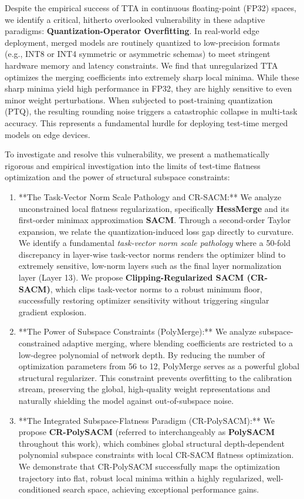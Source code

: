 Despite the empirical success of TTA in continuous floating-point (FP32) spaces, we identify a critical, hitherto overlooked vulnerability in these adaptive paradigms: \textbf{Quantization-Operator Overfitting}. In real-world edge deployment, merged models are routinely quantized to low-precision formats (e.g., INT8 or INT4 symmetric or asymmetric schemas) to meet stringent hardware memory and latency constraints. We find that unregularized TTA optimizes the merging coefficients into extremely sharp local minima. While these sharp minima yield high performance in FP32, they are highly sensitive to even minor weight perturbations. When subjected to post-training quantization (PTQ), the resulting rounding noise triggers a catastrophic collapse in multi-task accuracy. This represents a fundamental hurdle for deploying test-time merged models on edge devices.

To investigate and resolve this vulnerability, we present a mathematically rigorous and empirical investigation into the limits of test-time flatness optimization and the power of structural subspace constraints:
\begin{enumerate}
    \item **The Task-Vector Norm Scale Pathology and CR-SACM:** We analyze unconstrained local flatness regularization, specifically \textbf{HessMerge} and its first-order minimax approximation \textbf{SACM}. Through a second-order Taylor expansion, we relate the quantization-induced loss gap directly to curvature. We identify a fundamental \emph{task-vector norm scale pathology} where a 50-fold discrepancy in layer-wise task-vector norms renders the optimizer blind to extremely sensitive, low-norm layers such as the final layer normalization layer (Layer 13). We propose \textbf{Clipping-Regularized SACM (CR-SACM)}, which clips task-vector norms to a robust minimum floor, successfully restoring optimizer sensitivity without triggering singular gradient explosion.
    \item **The Power of Subspace Constraints (PolyMerge):** We analyze subspace-constrained adaptive merging, where blending coefficients are restricted to a low-degree polynomial of network depth. By reducing the number of optimization parameters from 56 to 12, PolyMerge serves as a powerful global structural regularizer. This constraint prevents overfitting to the calibration stream, preserving the global, high-quality weight representations and naturally shielding the model against out-of-subspace noise.
    \item **The Integrated Subspace-Flatness Paradigm (CR-PolySACM):** We propose \textbf{CR-PolySACM} (referred to interchangeably as \textbf{PolySACM} throughout this work), which combines global structural depth-dependent polynomial subspace constraints with local CR-SACM flatness optimization. We demonstrate that CR-PolySACM successfully maps the optimization trajectory into flat, robust local minima within a highly regularized, well-conditioned search space, achieving exceptional performance gains.
\end{enumerate}

